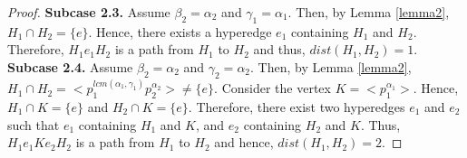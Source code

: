 \documentclass[11pt,a4paper]{article}
\theoremstyle{definition}
\theoremstyle{remark}
\begin{document}
\begin{proof}
			\textbf{Subcase 2.3.} Assume  $\beta_2=\alpha_2$ and  $\gamma_1=\alpha_1$. Then, by Lemma \ref{lemma2}, $H_1 \cap H_2 = \{e\}$. Hence, there exists a hyperedge $e_1$ containing $H_1$ and $H_2$. Therefore, $H_1 e_1 H_2$ is a path from $H_1$ to $H_2$ and thus,  $dist(H_1,H_2)=1$.\\
				\textbf{Subcase 2.4.} Assume  $\beta_2=\alpha_2$ and  $\gamma_2=\alpha_2$. Then, by Lemma \ref{lemma2}, $H_1 \cap H_2 = <p_1^{lcm(\alpha_1,\gamma_1)}p_2^{\alpha_2}> \neq \{e\}$.  Consider the vertex $K=<p_1^{\alpha_1}>$. Hence, $H_1 \cap K =\{e\}$ and $H_2 \cap K =\{e\}$. Therefore, there exist two hyperedges $e_1$ and $e_2$ such that $e_1$ containing $H_1$ and $K$, and $e_2$ containing $H_2$ and $K$. Thus, $H_1 e_1 K e_2 H_2$ is a path from $H_1$ to $H_2$ and hence, $dist(H_1,H_2)=2$.
				
				
				

\end{proof}
\end{document}

